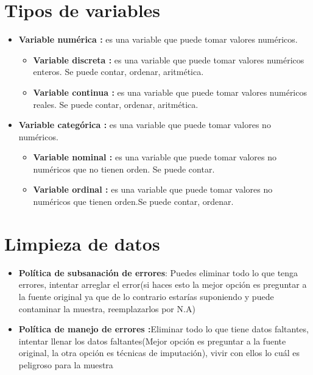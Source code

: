 \documentclass{report}
\begin{document}
\section{Tipos de variables}
\begin{itemize}
	\item {\textbf{Variable numérica :} es una variable que puede tomar valores numéricos.} \begin{itemize}
		      \item {\textbf{Variable discreta :} es una variable que puede tomar valores numéricos enteros. Se puede contar, ordenar, aritmética.}
		      \item {\textbf{Variable continua :} es una variable que puede tomar valores numéricos reales. Se puede contar, ordenar, aritmética.}
	      \end{itemize}
	\item {\textbf{Variable categórica :} es una variable que puede tomar valores no numéricos.} \begin{itemize}
		      \item {\textbf{Variable nominal :} es una variable que puede tomar valores no numéricos que no tienen orden. Se puede contar.}
		      \item {\textbf{Variable ordinal :} es una variable que puede tomar valores no numéricos que tienen orden.Se puede contar, ordenar.}
	      \end{itemize}

\end{itemize}
\begin{comment}
\begin{algorithm}[H]
	\KwIn{This is some input}
	\KwOut{This is some output}
	\SetAlgoLined
	\SetNoFillComment
	\tcc{This is a comment}
	\vspace{3mm}
	some code here\;
	$x \leftarrow 0$\;
	$y \leftarrow 0$\;
	\uIf{$ x > 5$} {
		x is greater than 5 \tcp*{This is also a comment}
	}
	\Else {
		x is less than or equal to 5\;
	}
	\ForEach{y in 0..5} {
		$y \leftarrow y + 1$\;
	}
	\For{$y$ in $0..5$} {
		$y \leftarrow y - 1$\;
	}
	\While{$x > 5$} {
		$x \leftarrow x - 1$\;
	}
	\Return Return something here\;
	\caption{what}
\end{algorithm}
\end{comment}
\section{Limpieza de datos}
\begin{itemize}
	\item {\textbf{Política de subsanación de errores}: Puedes eliminar todo lo que tenga errores, intentar arreglar el error(si haces esto la mejor opción es preguntar a la fuente original ya que de lo contrario estarías suponiendo y puede contaminar la muestra, reemplazarlos por N.A)}
	\item {\textbf{Política de manejo de errores :}Eliminar todo lo que tiene datos faltantes, intentar llenar los datos faltantes(Mejor opción es preguntar a la fuente original, la otra opción es técnicas de imputación), vivir con ellos lo cuál es peligroso para la muestra}
\end{itemize}
\end{document}
